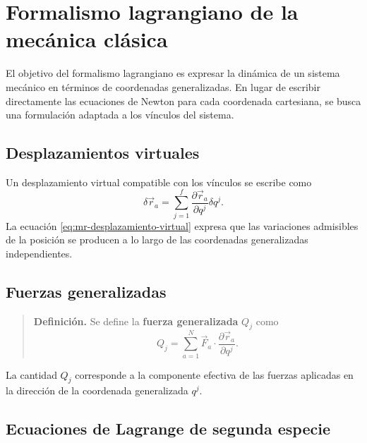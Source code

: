 \documentclass[../apunte_mecanica_clasica.tex]{subfiles}%
\begin{document}
\section{Formalismo lagrangiano de la mecánica clásica}
\label{sec:mr-formalismo-lagrangiano}

El objetivo del formalismo lagrangiano es expresar la dinámica de un sistema mecánico en términos de coordenadas generalizadas. En lugar de escribir directamente las ecuaciones de Newton para cada coordenada cartesiana, se busca una formulación adaptada a los vínculos del sistema.

\subsection{Desplazamientos virtuales}
\label{subsec:mr-desplazamientos-virtuales}

Un desplazamiento virtual compatible con los vínculos se escribe como
\begin{equation}
    \delta \vec r_a = \sum_{j=1}^{f}\frac{\partial \vec r_a}{\partial q^j}\delta q^j.
    \label{eq:mr-desplazamiento-virtual}
\end{equation}
La ecuación \eqref{eq:mr-desplazamiento-virtual} expresa que las variaciones admisibles de la posición se producen a lo largo de las coordenadas generalizadas independientes.

\subsection{Fuerzas generalizadas}
\label{subsec:mr-fuerzas-generalizadas}

\begin{quote}
\textbf{Definición.} Se define la \textbf{fuerza generalizada} $Q_j$ como
\begin{equation}
    Q_j=\sum_{a=1}^{N}\vec F_a\cdot \frac{\partial \vec r_a}{\partial q^j}.
    \label{eq:mr-fuerza-generalizada}
\end{equation}
\end{quote}

La cantidad $Q_j$ corresponde a la componente efectiva de las fuerzas aplicadas en la dirección de la coordenada generalizada $q^j$.

\subsection{Ecuaciones de Lagrange de segunda especie}
\label{subsec:mr-lagrange-segunda-especie}
\end{document}
